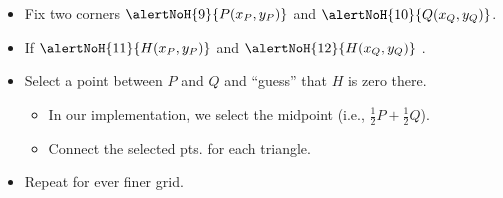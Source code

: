 \begin{frame}
\begin{columns}
\begin{itemize}
\begin{itemize}
\item<9-> Fix two corners $\alertNoH{9}{P(x_P, y_P)}$ and $\alertNoH{10}{Q(x_Q, y_Q)}$. 
\item<11-> If $\alertNoH{11}{H(x_P, y_P)}$ and $\alertNoH{12}{H(x_Q, y_Q)}$  . 
\item<15-> Select a point between $P$ and $Q$ and ``guess'' that $H$ is zero there. 
\begin{itemize}
\item<16-> In our implementation, we select the midpoint (i.e., $\frac{1}{2}P+\frac{1}{2}Q$).
\item<17-> Connect the selected pts. for each triangle.
\end{itemize}
\item<20-> Repeat for ever finer grid.
\end{itemize}

\end{itemize}
\end{columns}

\end{frame}